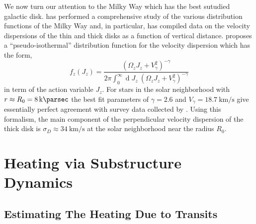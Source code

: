 \documentclass[usenatbib]{mnras}
\renewcommand{\d}[1]{\! \mathrm{d}#1 \:}
\renewcommand{\d}[1]{\ensuremath{\operatorname{d}\!{#1}}}
\begin{document}
\par
We now turn our attention to the Milky Way which has the best sutudied galactic disk. \cite{milky_way} has performed a comprehensive study of the various distribution functions of the Milky Way and, in particular, has compiled data on the velocity dispersions of the thin and thick disks as a function of vertical distance. \cite{milky_way} proposes a ``pseudo-isothermal'' distribution function for the velocity dispersion which has the form,
\begin{equation}
f_z(J_z) = \frac{\left( \Omega_z J_z + V_\gamma^2 \right)^{-\gamma}}{2 \pi \int_{0}^{\infty} \d{J_z} \: \left( \Omega_z J_z + V_\gamma^2 \right)^{-\gamma} }
\end{equation}  
in term of the action variable $J_z$. For stars in the solar neighborhood with $r \approx R_0 =  \SI{8}{\kilo \parsec}$ the best fit parameters of $\gamma = 2.6$ and $V_\gamma = \SI{18.7}{\kilo \meter \per \second}$ give essentially perfect agreement with survey data collected by \cite{milkyway-thickdisk}. Using this formalism, the main component of the perpendicular velocity dispersion of the thick disk is $\sigma_D \approx \SI{34}{\kilo \meter \per \second}$ at the solar neighborhood near the radius $R_0$.   



\section{Heating via Substructure Dynamics}

\subsection{Estimating The Heating Due to Transits}
\end{document}
